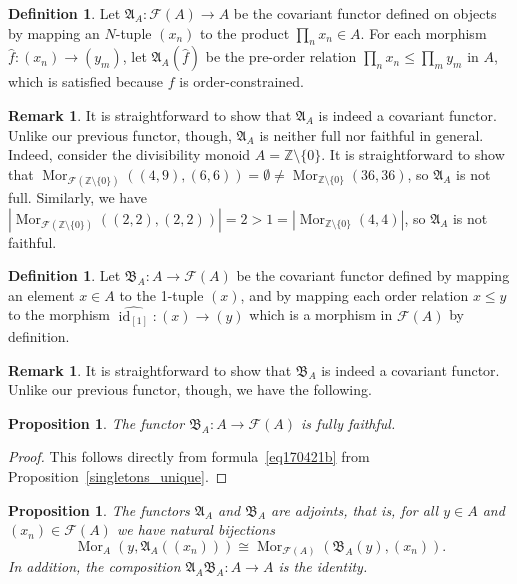 \documentclass[reqno]{amsart}
\theoremstyle{plain}
\newtheorem{prop}[lem]{Proposition}
\theoremstyle{definition}
\newtheorem{defn}[lem]{Definition}
\newtheorem{disc}[lem]{Remark}
\newcommand{\cat}[1]{\mathcal{#1}}
\newcommand{\catf}{\cat{F}}
\newcommand{\id}{\operatorname{id}}
\newcommand{\bbz}{\mathbb{Z}}
\renewcommand{\leq}{\leqslant}
\newcommand{\mor}[3]{\operatorname{Mor}_{#1}(#2,#3)}
\numberwithin{equation}{lem}
\begin{document}
\begin{defn}\label{defn170501b}
Let $\mathfrak{A}_A\colon\mathcal{F}(A) \to A$ be the covariant functor defined
on objects by mapping an $N$-tuple $(x_n)$ to the product
$\prod_n x_n\in A$. 
For each morphism $\hat{f}\colon (x_n) \to (y_m)$, let $\mathfrak{A}_A(\hat f)$ be the pre-order relation $\prod_n x_n \leq \prod_m y_m$
in 
$A$,
which is satisfied because $f$ is order-constrained.
\end{defn}

\begin{disc}\label{disc170430b}
It is straightforward to show that $\mathfrak A_A$ is indeed a covariant functor. 
Unlike our previous functor, though, $\mathfrak A_A$ is neither full nor faithful in general. 
Indeed, consider the divisibility monoid $A=\bbz\setminus\{0\}$.
It is straightforward to show that
$\mor{\catf(\bbz\setminus\{0\})}{(4,9)}{(6,6)}=\emptyset\neq\mor{\bbz\setminus\{0\}}{36}{36}$, so $\mathfrak A_A$ is not full.
Similarly, we have
$|\mor{\catf(\bbz\setminus\{0\})}{(2,2)}{(2,2)}|=2>1=|\mor{\bbz\setminus\{0\}}{4}{4}|$, so $\mathfrak A_A$ is not faithful.
\end{disc}

\begin{defn}\label{defn170501c}
Let $\mathfrak{B}_A\colon A\to\mathcal{F}(A)$ be the covariant functor defined by mapping an element
$x\in A$ to the 1-tuple $(x)$,
and by mapping each order relation $x\leq y$ to the morphism $\widehat{\id_{[1]}}\colon (x)\to(y)$
which is a morphism in $\catf(A)$ by definition.
\end{defn}

\begin{disc}\label{disc170430c}
It is straightforward to show that $\mathfrak B_A$ is indeed a covariant functor. 
Unlike our previous functor, though, we have the following.
\end{disc}

\begin{prop}\label{prop170430a}
The functor $\mathfrak B_A\colon A\to\mathcal{F}(A)$ is  fully faithful.
\end{prop}

\begin{proof}
This follows directly from 
formula~\eqref{eq170421b} from Proposition~\ref{singletons_unique}.
\end{proof}

\begin{prop}\label{prop170430b}
The functors $\mathfrak A_A$ and $\mathfrak B_A$ are adjoints, that is, for all $y\in A$ and $(x_n)\in\catf(A)$ we have
natural bijections
$$\mor{A}{y}{\mathfrak A_A((x_n))}
\cong\mor{\catf(A)}{\mathfrak B_A(y)}{(x_n)}.$$
In addition, the composition $\mathfrak{A}_A\mathfrak{B}_A\colon A\to A$ is the identity.
\end{prop}
\end{document}

